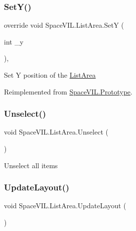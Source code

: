 \subsubsection{\texorpdfstring{Set\+Y()}{SetY()}}
{\footnotesize\ttfamily override void Space\+V\+I\+L.\+List\+Area.\+SetY (\begin{DoxyParamCaption}\item[{int}]{\+\_\+y }\end{DoxyParamCaption})\hspace{0.3cm}{\ttfamily [inline]}, {\ttfamily [virtual]}}



Set Y position of the \mbox{\hyperlink{class_space_v_i_l_1_1_list_area}{List\+Area}} 



Reimplemented from \mbox{\hyperlink{class_space_v_i_l_1_1_prototype}{Space\+V\+I\+L.\+Prototype}}.

\mbox{\label{class_space_v_i_l_1_1_list_area_ac7ed057dd6d34a265aaacca971c61b2b}} 
\subsubsection{\texorpdfstring{Unselect()}{Unselect()}}
{\footnotesize\ttfamily void Space\+V\+I\+L.\+List\+Area.\+Unselect (\begin{DoxyParamCaption}{ }\end{DoxyParamCaption})\hspace{0.3cm}{\ttfamily [inline]}}



Unselect all items 

\mbox{\label{class_space_v_i_l_1_1_list_area_af0fb95222910f6e85274a38dfa506174}} 
\subsubsection{\texorpdfstring{Update\+Layout()}{UpdateLayout()}}
{\footnotesize\ttfamily void Space\+V\+I\+L.\+List\+Area.\+Update\+Layout (\begin{DoxyParamCaption}{ }\end{DoxyParamCaption})\hspace{0.3cm}{\ttfamily [inline]}}



